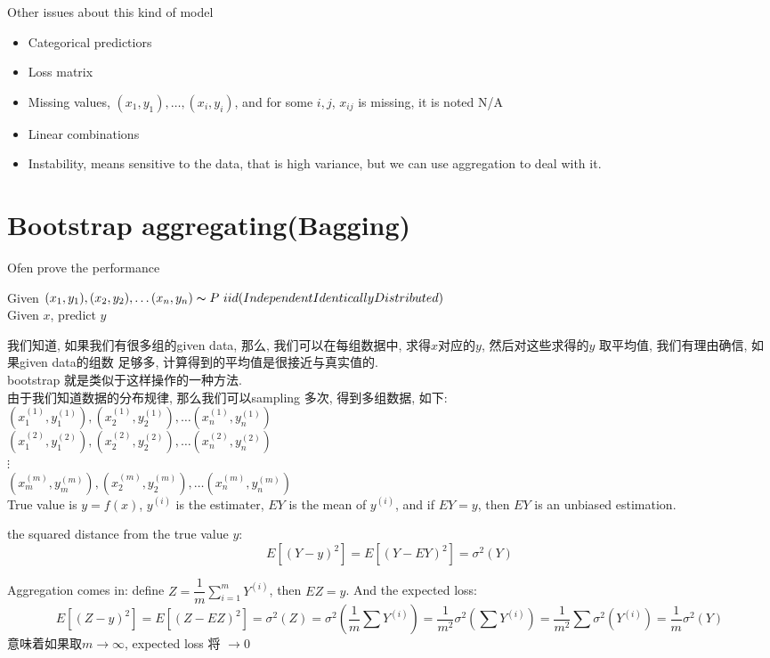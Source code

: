 \documentclass{article}
\begin{document}
Other issues about this kind of model
\begin{itemize}
\item Categorical predictiors
\item Loss matrix
\item Missing values, $(x_1, y_1), \ldots, (x_i, y_i)$, and for some $i,j$, $x_{ij}$ is missing, it is noted N/A
\item Linear combinations
\item Instability, means sensitive to the data, that is high variance, but we can use aggregation to deal with it.
\end{itemize}

\section{Bootstrap aggregating(Bagging)}
Ofen prove the performance

\noindent
Given $(x_1, y_1), (x_2, y_2), \ldots (x_n, y_n) \thicksim{P} \ iid(Independent Identically Distributed)$\\
Given $x$, predict $y$

我们知道, 如果我们有很多组的given data, 那么, 我们可以在每组数据中, 求得$x$对应的$y$, 然后对这些求得的$y$ 取平均值, 我们有理由确信, 如果given data的组数
足够多, 计算得到的平均值是很接近与真实值的.\\
bootstrap 就是类似于这样操作的一种方法.\\
由于我们知道数据的分布规律, 那么我们可以sampling 多次, 得到多组数据, 如下:\\
$(x_1^{(1)}, y_1^{(1)}), (x_2^{(1)}, y_2^{(1)}), \ldots (x_n^{(1)}, y_n^{(1)})$ \\
$(x_1^{(2)}, y_1^{(2)}), (x_2^{(2)}, y_2^{(2)}), \ldots (x_n^{(2)}, y_n^{(2)})$ \\
$\vdots$\\
$(x_m^{(m)}, y_m^{(m)}), (x_2^{(m)}, y_2^{(m)}), \ldots (x_n^{(m)}, y_n^{(m)})$ \\

\smallskip
True value is $y = f(x)$, $y^{(i)}$ is the estimater, $EY$ is the mean of $y^{(i)}$, and if $EY = y$, then $EY$ is an unbiased estimation.

the squared distance from the true value $y$:
$$E[(Y - y)^2] = E[(Y - EY)^2] = \sigma^2(Y)$$

Aggregation comes in:
define $Z =\dfrac{1}{m} \sum_{i = 1}^m Y^{(i)}$, then $EZ = y$.
And the expected loss:
$$
E[(Z - y)^2] = E[(Z - EZ)^2]
= \sigma^2(Z)
= \sigma^2(\dfrac{1}{m} \sum Y^{(i)})
= \frac{1}{m^2} \sigma^2(\sum Y^{(i)})
= \frac{1}{m^2} \sum \sigma^2(Y^{(i)})
= \frac{1}{m} \sigma^2(Y)
$$
意味着如果取$m \to \infty$, expected loss 将 $\to 0$
\end{document}
